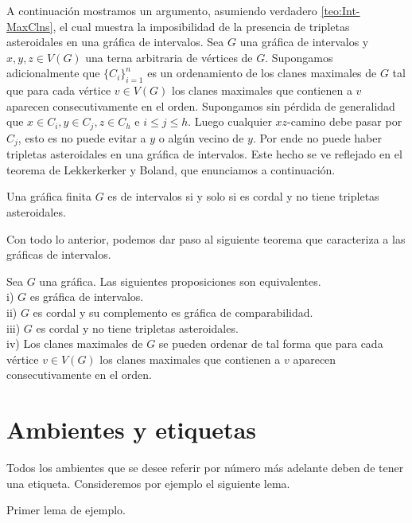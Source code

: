A continuación mostramos un argumento, asumiendo verdadero \cref{teo:Int-MaxClns}, el cual muestra la imposibilidad de la presencia de tripletas asteroidales en una gráfica de intervalos. Sea $G$ una gráfica de intervalos y $x,y,z \in V(G)$ una terna arbitraria de vértices de $G$. Supongamos adicionalmente que $\{C_i\}_{i=1}^n$ es un ordenamiento de los clanes maximales de $G$ tal que para cada vértice $v \in V(G)$ los clanes maximales que contienen a $v$ aparecen consecutivamente en el orden. Supongamos sin pérdida de generalidad que $x\in C_i, y \in C_j, z\in C_h$ e $i\leq j \leq h$. Luego cualquier $xz$-camino debe pasar por $C_j$, esto es no puede evitar a $y$ o algún vecino de $y$. Por ende no puede haber tripletas asteroidales en una gráfica de intervalos. Este hecho se ve reflejado en el teorema de Lekkerkerker y Boland, que enunciamos a continuación.

\begin{teorema}
    Una gráfica finita $G$ es de intervalos si y solo si es cordal y no tiene tripletas asteroidales.
\end{teorema}

Con todo lo anterior, podemos dar paso al siguiente teorema que caracteriza a las gráficas de intervalos.

\begin{teorema}
    Sea $G $ una gráfica. Las siguientes proposiciones son equivalentes.\\
    i) $G$ es gráfica de intervalos.\\
    ii) $G$ es cordal y su complemento es gráfica de comparabilidad.\\
    iii) $G$ es cordal y no tiene tripletas asteroidales.\\
    iv) Los clanes maximales de $G$ se pueden ordenar de tal forma que para cada vértice $v \in V(G)$ los clanes maximales que contienen a $v$ aparecen consecutivamente en el orden. 
\end{teorema}

 

\section{Ambientes y etiquetas}
\label{sec:etiquetas}

Todos los ambientes que se desee referir por n\'umero m\'as adelante deben de
tener una etiqueta.  Consideremos por ejemplo el siguiente lema.

\begin{lema}
\label{lem:primero}
Primer lema de ejemplo.
\end{lema}

